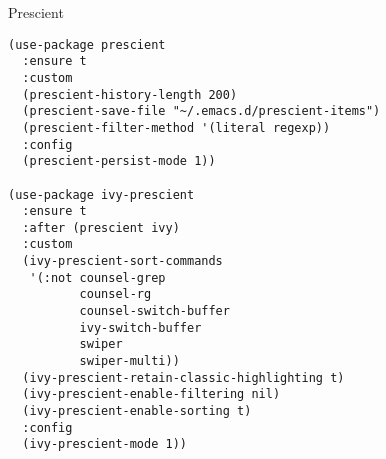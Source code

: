 \documentclass[12pt]{article}
\begin{document}
Prescient
\begin{verbatim}
(use-package prescient
  :ensure t
  :custom
  (prescient-history-length 200)
  (prescient-save-file "~/.emacs.d/prescient-items")
  (prescient-filter-method '(literal regexp))
  :config
  (prescient-persist-mode 1))

(use-package ivy-prescient
  :ensure t
  :after (prescient ivy)
  :custom
  (ivy-prescient-sort-commands
   '(:not counsel-grep
          counsel-rg
          counsel-switch-buffer
          ivy-switch-buffer
          swiper
          swiper-multi))
  (ivy-prescient-retain-classic-highlighting t)
  (ivy-prescient-enable-filtering nil)
  (ivy-prescient-enable-sorting t)
  :config
  (ivy-prescient-mode 1))

\end{verbatim}
\end{document}
